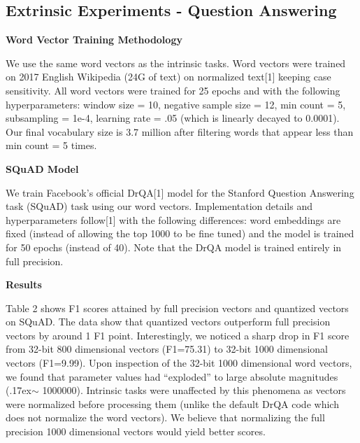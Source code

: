 \documentclass{article} %
\begin{document}
\subsection{Extrinsic Experiments - Question Answering}

\textbf{Word Vector Training Methodology}

We use the same word vectors as the intrinsic tasks. Word vectors were
trained on 2017 English Wikipedia (24G of text) on normalized text[1]
keeping case sensitivity. All word vectors were trained for 25 epochs
and with the following hyperparameters: window size = 10, negative
sample size = 12, min count = 5, subsampling = 1e-4, learning rate =
.05 (which is linearly decayed to 0.0001). Our final vocabulary size
is 3.7 million after filtering words that appear less than min count =
5 times.

\textbf{SQuAD Model}

We train Facebook's official DrQA[1] model for the Stanford Question Answering
task (SQuAD) task using our word vectors. Implementation details and
hyperparameters follow[1] with the following differences: word
embeddings are fixed (instead of allowing the top 1000 to be fine
tuned) and the model is trained for 50 epochs (instead of 40). Note
that the DrQA model is trained entirely in full precision.

\textbf{Results}

Table 2 shows F1 scores attained by full precision vectors and
quantized vectors on SQuAD. The data show that quantized vectors
outperform full precision vectors by around 1 F1 point. Interestingly,
we noticed a sharp drop in F1 score from 32-bit 800 dimensional
vectors (F1=75.31) to 32-bit 1000 dimensional vectors (F1=9.99). Upon
inspection of the 32-bit 1000 dimensional word vectors, we found that
parameter values had ``exploded'' to large absolute magnitudes
({\raise.17ex\hbox{$\scriptstyle\mathtt{\sim}$}} 1000000). Intrinsic
tasks were unaffected by this phenomena as vectors were normalized
before processing them (unlike the default DrQA code which does not
normalize the word vectors). We believe that normalizing the full
precision 1000 dimensional vectors would yield better scores.
\end{document}
